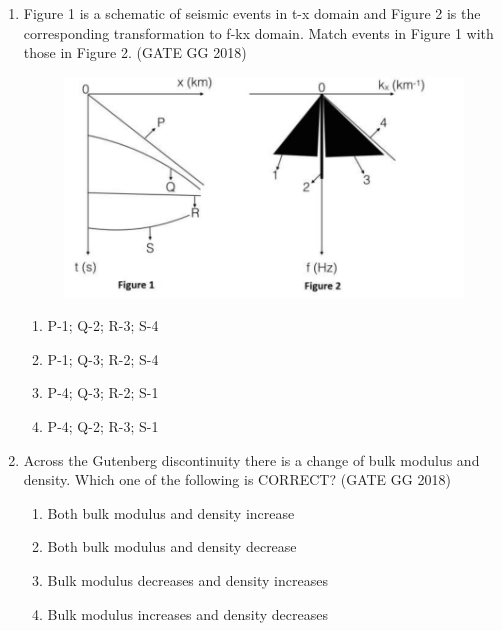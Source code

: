 \documentclass[journal]{IEEEtran}
\begin{document}
\begin{enumerate}[start=1]
\item Figure 1 is a schematic of seismic events in t-x domain and Figure 2 is the corresponding transformation to f-kx  domain. Match events in Figure 1 with those in Figure 2.
\hfill(GATE GG 2018)
\begin{figure}[H]
        \centering
        \includegraphics[width=0.5\columnwidth]{figs/08.png}
        \caption*{}
        \label{fig:q10}
    \end{figure}
    \begin{multicols}{2}
\begin{enumerate}
\item P-1; Q-2; R-3; S-4
\item P-1; Q-3; R-2; S-4
\item P-4; Q-3; R-2; S-1
\item P-4; Q-2; R-3; S-1
\end{enumerate}
\end{multicols}

\item Across the Gutenberg discontinuity  there is a change of bulk modulus and density. Which one of the following is CORRECT?
\hfill(GATE GG 2018)
\begin{multicols}{2}
\begin{enumerate}
\item Both bulk modulus and density increase
\item Both bulk modulus and density decrease
\item Bulk modulus decreases and density increases
\item Bulk modulus increases and density decreases
\end{enumerate}
\end{multicols}


\end{enumerate}
\end{document}
